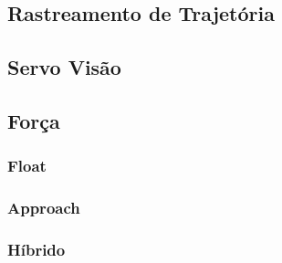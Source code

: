 \subsection{Rastreamento de Trajetória}
\subsection{Servo Visão}
\subsection{Força}
\subsubsection{Float}
\subsubsection{Approach}
\subsubsection{Híbrido}
